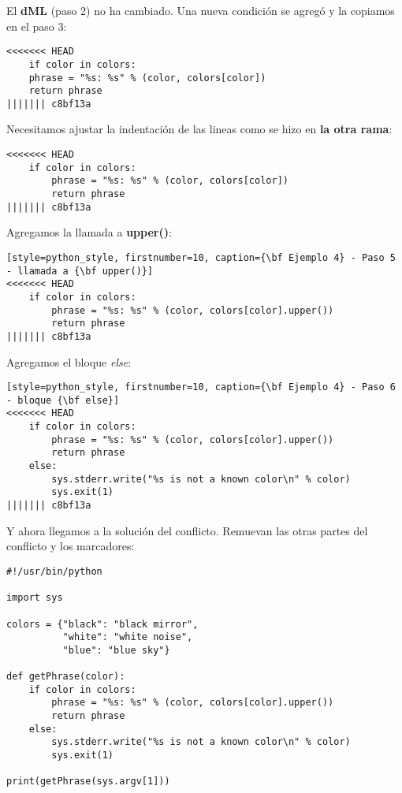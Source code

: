 El {\bf dML} (paso 2) no ha cambiado. Una nueva condición se agregó y la copiamos en el paso 3:
\begin{lstlisting}[style=python_style, firstnumber=10, caption={\bf Ejemplo 4} - Paso 3 - Conditional]
<<<<<<< HEAD
    if color in colors:
    phrase = "%s: %s" % (color, colors[color])
    return phrase
||||||| c8bf13a
\end{lstlisting}

Necesitamos ajustar la indentación de las lineas como se hizo en {\bf la otra rama}:
\begin{lstlisting}[style=python_style, firstnumber=10, caption={\bf Ejemplo 4} - Paso 4 - Adjustar indentación]
<<<<<<< HEAD
    if color in colors:
        phrase = "%s: %s" % (color, colors[color])
        return phrase
||||||| c8bf13a
\end{lstlisting}

Agregamos la llamada a {\bf upper()}:
\begin{lstlisting}[style=python_style, firstnumber=10, caption={\bf Ejemplo 4} - Paso 5 - llamada a {\bf upper()}]
<<<<<<< HEAD
    if color in colors:
        phrase = "%s: %s" % (color, colors[color].upper())
        return phrase
||||||| c8bf13a
\end{lstlisting}

Agregamos el bloque {\it else}:
\begin{lstlisting}[style=python_style, firstnumber=10, caption={\bf Ejemplo 4} - Paso 6 - bloque {\bf else}]
<<<<<<< HEAD
    if color in colors:
        phrase = "%s: %s" % (color, colors[color].upper())
        return phrase
    else:
        sys.stderr.write("%s is not a known color\n" % color)
        sys.exit(1)
||||||| c8bf13a
\end{lstlisting}
Y ahora llegamos a la solución del conflicto. Remuevan las otras partes del conflicto y los marcadores:

\begin{lstlisting}[style=python_style, caption={\bf Ejemplo 4} - final]
#!/usr/bin/python

import sys

colors = {"black": "black mirror",
          "white": "white noise",
          "blue": "blue sky"}

def getPhrase(color):
    if color in colors:
        phrase = "%s: %s" % (color, colors[color].upper())
        return phrase
    else:
        sys.stderr.write("%s is not a known color\n" % color)
        sys.exit(1)

print(getPhrase(sys.argv[1]))
\end{lstlisting}

